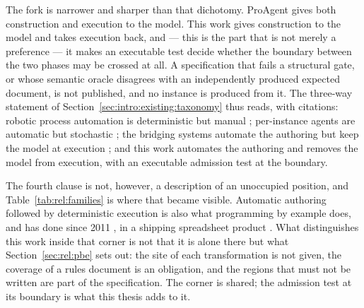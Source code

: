 The fork is narrower and sharper than that dichotomy. ProAgent gives both construction and
execution to the model. This work gives construction to the model and takes execution back,
and --- this is the part that is not merely a preference --- it makes an executable test decide
whether the boundary between the two phases may be crossed at all. A specification that fails
a structural gate, or whose semantic oracle disagrees with an independently produced expected
document, is not published, and no instance is produced from it. The three-way statement of
Section~\ref{sec:intro:existing:taxonomy} thus reads, with citations: robotic process
automation is deterministic but manual \cite{wewerka2020rpa}; per-instance agents are automatic
but stochastic \cite{xie2024osworld,lv2026mindthegap}; the bridging systems automate the
authoring but keep the model at execution \cite{ye2023proagent,huang2025prompt2task}; and this
work automates the authoring and removes the model from execution, with an executable admission
test at the boundary.

The fourth clause is not, however, a description of an unoccupied position, and
Table~\ref{tab:rel:families} is where that became visible. Automatic authoring followed by
deterministic execution is also what programming by example does, and has done since 2011
\cite{gulwani2011flashfill}, in a shipping spreadsheet product
\cite{cambronero2023flashfillpp}. What distinguishes this work inside that corner is not that
it is alone there but what Section~\ref{sec:rel:pbe} sets out: the site of each transformation
is not given, the coverage of a rules document is an obligation, and the regions that must not
be written are part of the specification. The corner is shared; the admission test at its
boundary is what this thesis adds to it.


